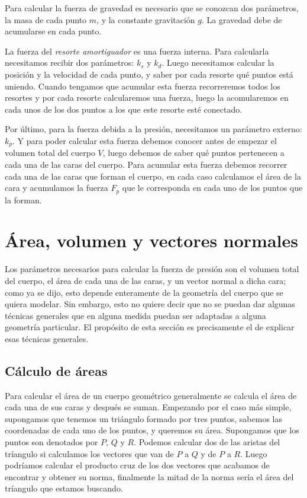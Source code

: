 Para calcular la fuerza de gravedad es necesario que se conozcan dos parámetros, la masa de cada punto $m$, y la constante gravitación $g$. La gravedad debe de acumularse en cada punto.

La fuerza del \emph{resorte amortiguador} es una fuerza interna. Para calcularla  necesitamos recibir dos parámetros: $k_s$ y $k_d$. Luego necesitamos calcular la posición y la velocidad de cada punto, y saber por cada resorte qué puntos está uniendo. Cuando tengamos que acumular esta fuerza recorreremos todos los resortes y por cada resorte calcularemos una fuerza, luego la acomularemos en cada unos de los dos puntos a los que este resorte esté conectado.

Por último, para la fuerza debida a la presión, necesitamos un parámetro externo: $k_p$. Y para poder calcular esta fuerza debemos conocer antes de empezar el volumen total del cuerpo $V$, luego debemos de saber qué puntos pertenecen a cada una de las caras del cuerpo. Para acumular esta fuerza debemos recorrer cada una de las caras que forman el cuerpo, en cada caso calculamos el área de la cara y acumulamos la fuerza $F_p$ que le corresponda en cada uno de los puntos que la forman.

\section{Área, volumen y vectores normales}
Los parámetros necesarios para calcular la fuerza de presión son el volumen total del cuerpo, el área de cada una de las caras, y un vector normal a dicha cara; como ya se dijo, esto depende enteramente de la geometría del cuerpo que se quiera modelar. Sin embargo, esto no quiere decir que no se puedan dar algunas técnicas generales que en alguna medida puedan ser adaptadas a alguna geometría particular. El propósito de esta sección es precisamente el de explicar esas técnicas generales.

\subsection{Cálculo de áreas}
Para calcular el área de un cuerpo geométrico generalmente se calcula el área de cada una de sus caras y después se suman. Empezando por el caso más simple, supongamos que tenemos un triángulo formado por tres puntos, sabemos las coordenadas de cada uno de los puntos, y queremos su área. Supongamos que los puntos son denotados por $P$, $Q$ y $R$. Podemos calcular dos de las aristas del tríangulo si calculamos los vectores que van de $P$ a $Q$ y de $P$ a $R$. Luego podríamos calcular el producto cruz de los dos vectores que acabamos de encontrar y obtener su norma, finalmente la mitad de la norma sería el área del tríangulo que estamos buscando.

